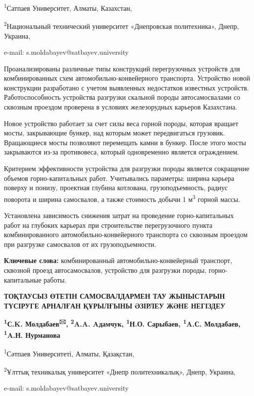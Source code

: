 \textsuperscript{1}Сатпаев Университет, Алматы, Казахстан,

\textsuperscript{2}Национальный технический университет «Днепровская
политехника», Днепр, Украина,

e-mail: s.moldabayev@satbayev.university

Проанализированы различные типы конструкций перегрузочных устройств для
комбинированных схем автомобильно-конвейерного транспорта. Устройство
новой конструкции разработано с учетом выявленных недостатков известных
устройств. Работоспособность устройства разгрузки скальной породы
автосамосвалами со сквозным проездом проверена в условиях железорудных
карьеров Казахстана.

Новое устройство работает за счет силы веса горной породы, которая
вращает мосты, закрывающие бункер, над которым может передвигаться
грузовик. Вращающиеся мосты позволяют перемещать камни в бункер. После
этого мосты закрываются из-за противовеса, который одновременно является
ограждением.

Критерием эффективности устройства для разгрузки породы является
сокращение объемов горно-капитальных работ. Учитывались параметры:
ширина карьера поверху и понизу, проектная глубина котлована,
грузоподъемность, радиус поворота и ширина самосвалов, а также стоимость
добычи 1 м\textsuperscript{3} горной массы.

Установлена зависимость снижения затрат на проведение горно-капитальных
работ на глубоких карьерах при строительстве перегрузочного пункта
комбинированного автомобильно-конвейерного транспорта со сквозным
проездом при разгрузке самосвалов от их грузоподъемности.

{\bfseries Ключевые слова:} комбинированный автомобильно-конвейерный
транспорт, сквозной проезд автосамосвалов, устройство для разгрузки
породы, горно-капитальные работы\emph{.}

{\bfseries ТОҚТАУСЫЗ ӨТЕТІН САМОСВАЛДАРМЕН ТАУ ЖЫНЫСТАРЫН ТҮСІРУГЕ АРНАЛҒАН
ҚҰРЫЛҒЫНЫ ӘЗІРЛЕУ ЖӘНЕ НЕГІЗДЕУ}

{\bfseries \textsuperscript{1}С.K. Молдабаев\textsuperscript{🖂},
\textsuperscript{2}A.A. Aдамчук, \textsuperscript{1}Н.О. Сарыбаев,
\textsuperscript{1}A.С. Молдабаев, \textsuperscript{1}A.Н. Нурманова}

\textsuperscript{1}Сәтпаев Университеті, Алматы, Қазақстан,

\textsuperscript{2}Ұлттық техникалық университет «Днепр политехникалық»,
Днепр, Украина,

e-mail: s.moldabayev@satbayev.university

